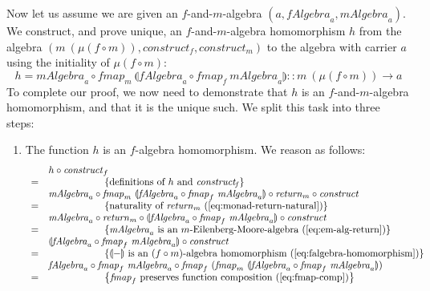 \documentclass{jfp1}
\newcommand{\fold}[1]{\llparenthesis #1 \rrparenthesis}
\newcommand{\eqAnnotation}[1]{\hspace{2cm}\left\{\textrm{#1}\right\}}
\begin{document}
\begin{proof*}
  Now let us assume we are given an $f$-and-$m$-algebra $(a,
  \mathit{fAlgebra}_a, \mathit{mAlgebra}_a)$. We construct, and prove
  unique, an $f$-and-$m$-algebra homomorphism $h$ from the algebra
  $(m~(\mu(f \circ m)), \mathit{construct}_f, \mathit{construct}_m)$
  to the algebra with carrier $a$ using the initiality of $\mu(f \circ
  m)$:
  \begin{displaymath}
    h = \mathit{mAlgebra}_a \circ \mathit{fmap}_m~\fold{\mathit{fAlgebra}_a \circ \mathit{fmap}_f~\mathit{mAlgebra}_a} :: m~(\mu(f \circ m)) \to a
  \end{displaymath}
  To complete our proof, we now need to demonstrate that $h$ is an
  $f$-and-$m$-algebra homomorphism, and that it is the unique such. We
  split this task into three steps:
  \begin{enumerate}
  \item The function $h$ is an $f$-algebra homomorphism. We reason as
    follows:
    \begin{displaymath}
      \begin{array}{cl}
        & h \circ \mathit{construct}_f \\
        =&\eqAnnotation{definitions of $h$ and $\mathit{construct_f}$} \\
         &\mathit{mAlgebra}_a \circ \mathit{fmap}_m~\fold{\mathit{fAlgebra}_a \circ \mathit{fmap}_f~\mathit{mAlgebra}_a} \circ \mathit{return}_m \circ \mathit{construct} \\
        =&\eqAnnotation{naturality of $\mathit{return}_m$ (\autoref{eq:monad-return-natural})} \\
         &\mathit{mAlgebra}_a \circ \mathit{return}_m \circ \fold{\mathit{fAlgebra}_a \circ \mathit{fmap}_f~\mathit{mAlgebra}_a} \circ \mathit{construct} \\
        =&\eqAnnotation{$\mathit{mAlgebra}_a$ is an $m$-Eilenberg-Moore-algebra (\autoref{eq:em-alg-return})} \\
         &\fold{\mathit{fAlgebra}_a \circ \mathit{fmap}_f~\mathit{mAlgebra}_a} \circ \mathit{construct} \\
        =&\eqAnnotation{$\fold{-}$ is an $(f \circ m)$-algebra homomorphism (\autoref{eq:falgebra-homomorphism})} \\
         &\mathit{fAlgebra}_a \circ \mathit{fmap}_f~\mathit{mAlgebra}_a \circ \mathit{fmap}_f~(\mathit{fmap}_m~\fold{\mathit{fAlgebra}_a \circ \mathit{fmap}_f~\mathit{mAlgebra}_a}) \\
        =&\eqAnnotation{$\mathit{fmap}_f$ preserves function composition (\autoref{eq:fmap-comp})} \\

\end{array}
\end{displaymath}
\end{enumerate}
\end{proof*}
\end{document}
